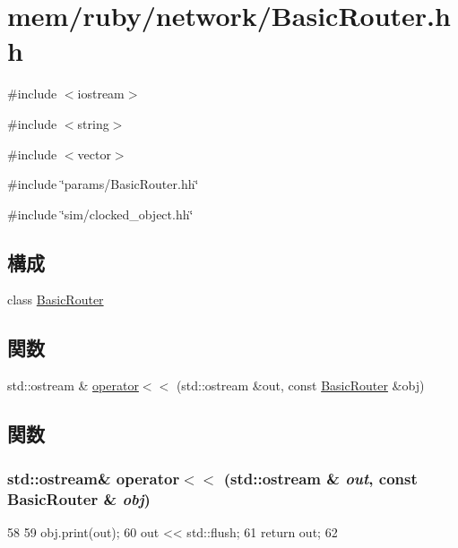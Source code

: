 \hypertarget{BasicRouter_8hh}{
\section{mem/ruby/network/BasicRouter.hh}
\label{BasicRouter_8hh}
}
{\ttfamily \#include $<$iostream$>$}\par
{\ttfamily \#include $<$string$>$}\par
{\ttfamily \#include $<$vector$>$}\par
{\ttfamily \#include \char`\"{}params/BasicRouter.hh\char`\"{}}\par
{\ttfamily \#include \char`\"{}sim/clocked\_\-object.hh\char`\"{}}\par
\subsection*{構成}
\begin{DoxyCompactItemize}
\item 
class \hyperlink{classBasicRouter}{BasicRouter}
\end{DoxyCompactItemize}
\subsection*{関数}
\begin{DoxyCompactItemize}
\item 
std::ostream \& \hyperlink{BasicRouter_8hh_ab6034ecc042ce0c905cd66e9d962bb80}{operator$<$$<$} (std::ostream \&out, const \hyperlink{classBasicRouter}{BasicRouter} \&obj)
\end{DoxyCompactItemize}


\subsection{関数}
\hypertarget{BasicRouter_8hh_ab6034ecc042ce0c905cd66e9d962bb80}{
\subsubsection[{operator$<$$<$}]{\setlength{\rightskip}{0pt plus 5cm}std::ostream\& operator$<$$<$ (std::ostream \& {\em out}, \/  const {\bf BasicRouter} \& {\em obj})}}
\label{BasicRouter_8hh_ab6034ecc042ce0c905cd66e9d962bb80}



\begin{DoxyCode}
58 {
59     obj.print(out);
60     out << std::flush;
61     return out;
62 }
\end{DoxyCode}
